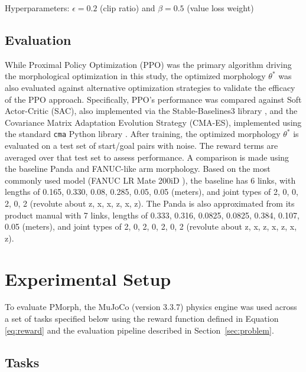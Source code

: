 \documentclass[defaultstyle,11pt]{thesis}
\begin{document}
Hyperparameters: \(\epsilon=0.2\) (clip ratio) and \(\beta=0.5\) (value loss weight)

\section{Evaluation}

While Proximal Policy Optimization (PPO) was the primary algorithm driving the morphological optimization in this study, the optimized morphology \(\theta^*\) was also evaluated against alternative optimization strategies to validate the efficacy of the PPO approach. 
Specifically, PPO's performance was compared against Soft Actor-Critic (SAC), also implemented via the Stable-Baselines3 library \cite{raffin2021stable}, and the Covariance Matrix Adaptation Evolution Strategy (CMA-ES), implemented using the standard \texttt{cma} Python library \cite{hansen2001completely, hansen2019pycma}.
After training, the optimized morphology \(\theta^*\) is evaluated on a test set of start/goal pairs with noise.
The reward terms are averaged over that test set to assess performance.
A comparison is made using the baseline Panda and FANUC-like arm morphology.
Based on the most commonly used model (FANUC LR Mate 200iD \cite{fanuc2024lrmate}), the baseline has 6 links, with lengths of 0.165, 0.330, 0.08, 0.285, 0.05, 0.05 (meters), and joint types of 2, 0, 0, 2, 0, 2 (revolute about z, x, x, z, x, z).
The Panda is also approximated from its product manual \cite{franka2024research3} with 7 links, lengths of 0.333, 0.316, 0.0825, 0.0825, 0.384, 0.107, 0.05 (meters), and joint types of 2, 0, 2, 0, 2, 0, 2 (revolute about z, x, z, x, z, x, z).


\chapter{Experimental Setup}

To evaluate PMorph, the MuJoCo (version 3.3.7) physics engine was used across a set of tasks specified below using the reward function defined in Equation \eqref{eq:reward} and the evaluation pipeline described in Section~\ref{sec:problem}.

\section{Tasks}
\end{document}
